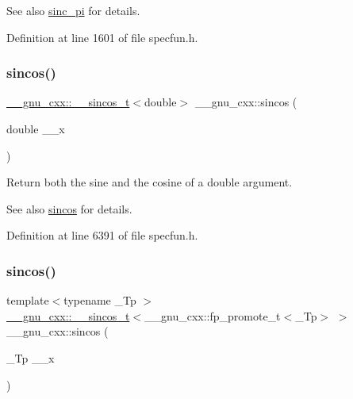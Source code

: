 \begin{DoxySeeAlso}{See also}
\hyperlink{group__gnu__math__spec__func_ga5195270024403b985e7d4f2f935f8779}{sinc\+\_\+pi} for details. 
\end{DoxySeeAlso}


Definition at line 1601 of file specfun.\+h.

\mbox{\label{group__gnu__math__spec__func_ga8041c24b528475bcf8a4178e484652a3}} 
\subsubsection{\texorpdfstring{sincos()}{sincos()}\hspace{0.1cm}{\footnotesize\ttfamily [1/2]}}
{\footnotesize\ttfamily \hyperlink{struct____gnu__cxx_1_1____sincos__t}{\+\_\+\+\_\+gnu\+\_\+cxx\+::\+\_\+\+\_\+sincos\+\_\+t}$<$double$>$ \+\_\+\+\_\+gnu\+\_\+cxx\+::sincos (\begin{DoxyParamCaption}\item[{double}]{\+\_\+\+\_\+x }\end{DoxyParamCaption})\hspace{0.3cm}{\ttfamily [inline]}}

Return both the sine and the cosine of a {\ttfamily double} argument.

\begin{DoxySeeAlso}{See also}
\hyperlink{group__gnu__math__spec__func_ga8041c24b528475bcf8a4178e484652a3}{sincos} for details. 
\end{DoxySeeAlso}


Definition at line 6391 of file specfun.\+h.

\mbox{\label{group__gnu__math__spec__func_ga5d3a375ada451e0a9a78441ddfcf52a3}} 
\subsubsection{\texorpdfstring{sincos()}{sincos()}\hspace{0.1cm}{\footnotesize\ttfamily [2/2]}}
{\footnotesize\ttfamily template$<$typename \+\_\+\+Tp $>$ \\
\hyperlink{struct____gnu__cxx_1_1____sincos__t}{\+\_\+\+\_\+gnu\+\_\+cxx\+::\+\_\+\+\_\+sincos\+\_\+t}$<$\+\_\+\+\_\+gnu\+\_\+cxx\+::fp\+\_\+promote\+\_\+t$<$\+\_\+\+Tp$>$ $>$ \+\_\+\+\_\+gnu\+\_\+cxx\+::sincos (\begin{DoxyParamCaption}\item[{\+\_\+\+Tp}]{\+\_\+\+\_\+x }\end{DoxyParamCaption})\hspace{0.3cm}{\ttfamily [inline]}}

